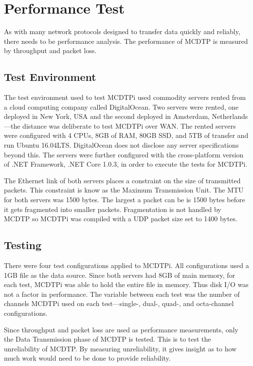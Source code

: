 \chapter{Performance Test}

As with many network protocols designed to transfer data quickly and reliably, there needs to be performance analysis. The performance of MCDTP is measured by throughput and packet loss.

\section{Test Environment}

The test environment used to test MCDTPi used commodity servers rented from a cloud computing company called DigitalOcean. Two servers were rented, one deployed in New York, USA and the second deployed in Amsterdam, Netherlands---the distance was deliberate to test MCDTPi over WAN. The rented servers were configured with 4 CPUs, 8GB of RAM, 80GB SSD, and 5TB of transfer and run Ubuntu 16.04LTS. DigitalOcean does not disclose any server specifications beyond this. The servers were further configured with the cross-platform version of .NET Framework, .NET Core 1.0.3, in order to execute the tests for MCDTPi.

The Ethernet link of both servers places a constraint on the size of transmitted packets. This constraint is know as the Maximum Transmission Unit. The MTU for both servers was 1500 bytes. The largest a packet can be is 1500 bytes before it gets fragmented into smaller packets. Fragmentation is not handled by MCDTP so MCDTPi was compiled with a UDP packet size set to 1400 bytes.

\section{Testing}

There were four test configurations applied to MCDTPi. All configurations used a 1GB file as the data source. Since both servers had 8GB of main memory, for each test, MCDTPi was able to hold the entire file in memory. Thus disk I/O was not a factor in performance. The variable between each test was the number of channels MCDTPi used on each test---single-, dual-, quad-, and octa-channel configurations.

Since throughput and packet loss are used as performance measurements, only the Data Transmission phase of MCDTP is tested. This is to test the unreliability of MCDTP. By measuring unreliability, it gives insight as to how much work would need to be done to provide reliability.

